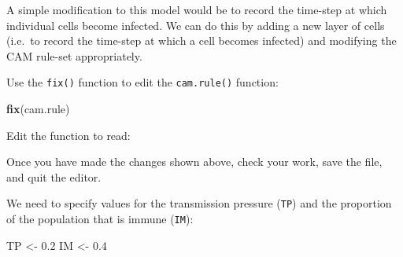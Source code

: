 \documentclass[12pt,a4paper]{book}
\newenvironment{Shaded}{\begin{snugshade}}{\end{snugshade}}
\newcommand{\ControlFlowTok}[1]{\textcolor[rgb]{0.13,0.29,0.53}{\textbf{#1}}}
\newcommand{\DecValTok}[1]{\textcolor[rgb]{0.00,0.00,0.81}{#1}}
\newcommand{\FloatTok}[1]{\textcolor[rgb]{0.00,0.00,0.81}{#1}}
\newcommand{\KeywordTok}[1]{\textcolor[rgb]{0.13,0.29,0.53}{\textbf{#1}}}
\newcommand{\NormalTok}[1]{#1}
\newcommand{\OperatorTok}[1]{\textcolor[rgb]{0.81,0.36,0.00}{\textbf{#1}}}
\newcommand{\StringTok}[1]{\textcolor[rgb]{0.31,0.60,0.02}{#1}}
\theoremstyle{definition}
\theoremstyle{definition}
\theoremstyle{definition}
\theoremstyle{remark}
\begin{document}
A simple modification to this model would be to record the time-step at
which individual cells become infected. We can do this by adding a new
layer of cells (i.e.~to record the time-step at which a cell becomes
infected) and modifying the CAM rule-set appropriately.

Use the \texttt{fix()} function to edit the \texttt{cam.rule()}
function:

\begin{Shaded}
\begin{Highlighting}[]
\KeywordTok{fix}\NormalTok{(cam.rule)}
\end{Highlighting}
\end{Shaded}

Edit the function to read:

\begin{Shaded}
\end{Shaded}

Once you have made the changes shown above, check your work, save the
file, and quit the editor.

We need to specify values for the transmission pressure (\texttt{TP})
and the proportion of the population that is immune (\texttt{IM}):

\begin{Shaded}
\begin{Highlighting}[]
\NormalTok{TP <-}\StringTok{ }\FloatTok{0.2}
\NormalTok{IM <-}\StringTok{ }\FloatTok{0.4}
\end{Highlighting}
\end{Shaded}
\end{document}

